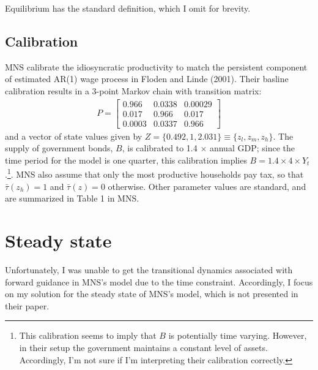 \documentclass[12pt]{article}
\newcommand{\mtx}[1]{\ensuremath{\bm{\mathit{#1}}}}
\begin{document}
Equilibrium has the standard definition, which I omit for brevity.

\subsection{Calibration}
MNS calibrate the idiosyncratic productivity to match the persistent component of estimated AR(1) wage process in Floden and Linde (2001). Their basline calibration results in a 3-point Markov chain with transition matrix:
\begin{align*}
\mtx{P} = 
\begin{bmatrix}
0.966 &	0.0338 &	0.00029 \\
0.017&	0.966& 	0.017 \\
0.0003 &	0.0337 &	0.966
\end{bmatrix}
\end{align*} 
and a vector of state values given by $Z = \{0.492,1,2.031\} \equiv \{z_l, z_m, z_h\}$. The supply of government bonds, $B$, is calibrated to 1.4 $\times$ annual GDP; since the time period for the model is one quarter, this calibration implies $B = 1.4 \times 4 \times Y_t$.\footnote{This calibration seems to imply that $B$ is potentially time varying. However, in their setup the government maintains a constant level of assets. Accordingly, I'm not sure if I'm interpreting their calibration correctly.}. MNS also assume that only the most productive households pay tax, so that $\bar \tau(z_h) = 1$ and $\bar \tau(z)=0$ otherwise. Other parameter values are standard, and are summarized in Table 1 in MNS.

\section{Steady state}
Unfortunately, I was unable to get the transitional dynamics associated with forward guidance in MNS's model due to the time constraint. Accordingly, I focus on my solution for the steady state of MNS's model, which is not presented in their paper.
\end{document}
